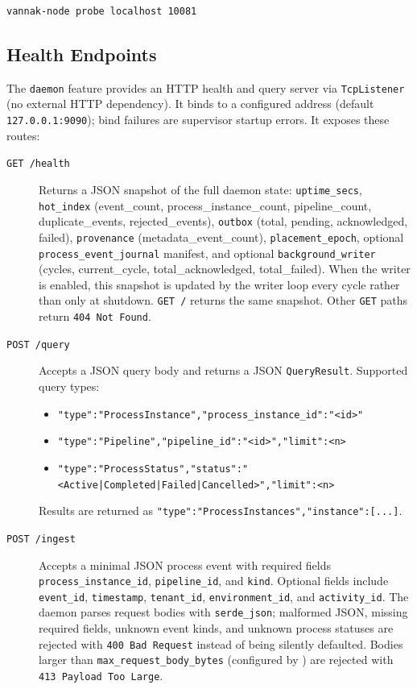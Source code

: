 \begin{lstlisting}[numbers=none]
vannak-node probe localhost 10081
\end{lstlisting}

\subsection{Health Endpoints}

The \texttt{daemon} feature provides an HTTP health and query server via
\texttt{TcpListener} (no external HTTP dependency). It binds to a configured
address (default \texttt{127.0.0.1:9090}); bind failures are supervisor startup
errors. It exposes these routes:

\begin{description}
\item[\texttt{GET /health}] Returns a JSON snapshot of the full daemon state:
  \texttt{uptime\_secs}, \texttt{hot\_index} (event\_count,
  process\_instance\_count, pipeline\_count, duplicate\_events,
  rejected\_events), \texttt{outbox} (total, pending, acknowledged, failed),
  \texttt{provenance} (metadata\_event\_count), \texttt{placement\_epoch},
  optional \texttt{process\_event\_journal} manifest, and optional
  \texttt{background\_writer} (cycles, current\_cycle,
  total\_acknowledged, total\_failed). When the writer is enabled, this snapshot
  is updated by the writer loop every cycle rather than only at shutdown.
  \texttt{GET /} returns the same snapshot. Other \texttt{GET} paths return
  \texttt{404 Not Found}.

\item[\texttt{POST /query}] Accepts a JSON query body and returns a JSON
  \texttt{QueryResult}. Supported query types:
  \begin{itemize}
  \item \texttt{"type":"ProcessInstance","process\_instance\_id":"<id>"}
  \item \texttt{"type":"Pipeline","pipeline\_id":"<id>","limit":<n>}
  \item \texttt{"type":"ProcessStatus","status":"<Active|Completed|Failed|Cancelled>","limit":<n>}
  \end{itemize}
  Results are returned as \texttt{"type":"ProcessInstances","instance":[...]}.

\item[\texttt{POST /ingest}] Accepts a minimal JSON process event with required
  fields \texttt{process\_instance\_id}, \texttt{pipeline\_id}, and
  \texttt{kind}. Optional fields include \texttt{event\_id},
  \texttt{timestamp}, \texttt{tenant\_id}, \texttt{environment\_id}, and
  \texttt{activity\_id}. The daemon parses request bodies with
  \texttt{serde\_json}; malformed JSON, missing required fields, unknown event
  kinds, and unknown process statuses are rejected with \texttt{400 Bad Request}
  instead of being silently defaulted. Bodies larger than
  \texttt{max\_request\_body\_bytes} (configured by
  ) are rejected with
  \texttt{413 Payload Too Large}.
\end{description}

